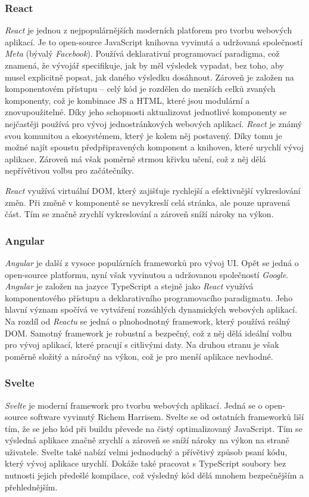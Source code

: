 \subsubsection*{React}
\textit{React} je jednou z nejpopulárnějších moderních platforem pro tvorbu webových aplikací. Je to open-source JavaScript knihovna vyvinutá a udržovaná společností \textit{Meta} (bývalý \textit{Facebook}). Používá deklarativní programovací paradigma, což znamená, že vývojář specifikuje, jak by měl výsledek vypadat, bez toho, aby musel explicitně popsat, jak daného výsledku dosáhnout. Zároveň je založen na komponentovém přístupu -- celý kód je rozdělen do menších celků zvaných komponenty, což je kombinace JS a HTML, které jsou modulární a znovupoužitelné. Díky jeho schopnosti aktualizovat jednotlivé komponenty se nejčastěji používá pro vývoj jednostránkových webových aplikací. \textit{React} je známý svou komunitou a ekosystémem, který je kolem něj postavený. Díky tomu je možné najít spoustu předpřipravených komponent a knihoven, které urychlí vývoj aplikace. Zároveň má však poměrně strmou křivku učení, což z něj dělá nepřívětivou volbu pro začátečníky.

\textit{React} využívá virtuální DOM, který zajišťuje rychlejší a efektivnější vykreslování změn. Při změně v komponentě se nevykreslí celá stránka, ale pouze upravená část. Tím se značně zrychlí vykreslování a zároveň sníží nároky na výkon. \cite{react, what_react_is_and_why_it_matters,angular_vs_react}

\subsubsection*{Angular}
\textit{Angular} je další z vysoce populárních frameworků pro vývoj UI. Opět se jedná o open-source platformu, nyní však vyvinutou a udržovanou společností \textit{Google}. \textit{Angular} je založen na jazyce TypeScript a stejně jako \textit{React} využívá komponentového přístupu a deklarativního programovacího paradigmatu. Jeho hlavní význam spočívá ve vytváření rozsáhlých dynamických webových aplikací. Na rozdíl od \textit{Reactu} se jedná o plnohodnotný framework, který používá reálný DOM. Samotný framework je robustní a bezpečný, což z něj dělá ideální volbu pro vývoj aplikací, které pracují s citlivými daty. Na druhou stranu je však poměrně složitý a náročný na výkon, což je pro menší aplikace nevhodné. \cite{what_is_angular,angular_vs_react}

\subsubsection*{Svelte}
\textit{Svelte} je moderní framework pro tvorbu webových aplikací. Jedná se o open-source software vyvinutý Richem Harrisem. Svelte se od ostatních frameworků liší tím, že se jeho kód při buildu převede na čistý optimalizovaný JavaScript. Tím se výsledná aplikace značně zrychlí a zároveň se sníží nároky na výkon na straně uživatele. Svelte také nabízí velmi jednoduchý a přívětivý způsob psaní kódu, který vývoj aplikace urychlí. Dokáže také pracovat s TypeScript soubory bez nutnosti jejich předešlé kompilace, což výsledný kód dělá mnohem bezpečnějším a přehlednějším. \cite{svelte_and_why_you_should_consider_it,svelte}

